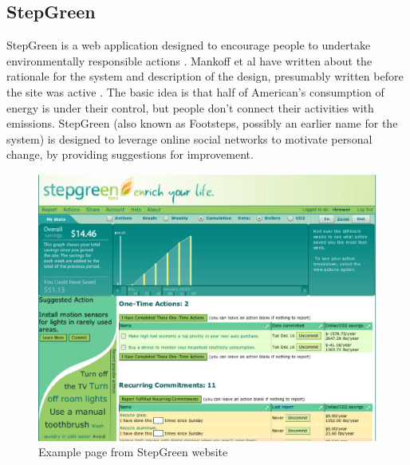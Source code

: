 \subsection{StepGreen}

StepGreen is a web application designed to encourage people to undertake environmentally responsible actions \cite{step-green-website}. Mankoff et al have written about the rationale for the system and description of the design, presumably written before the site was active \cite{Mankoff2007Leveraging-Soci}. The basic idea is that half of American's consumption of energy is under their control, but people don't connect their activities with \COtwo emissions. StepGreen (also known as Footsteps, possibly an earlier name for the system) is designed to leverage online social networks to motivate personal change, by providing suggestions for improvement.

\begin{figure}[htbp]
	\begin{center}
		\includegraphics[width=\textwidth]{figures/final/stepgreen-bitmap}
		\caption{Example page from StepGreen website}
		\label{fig:stepgreen-website}
 	\end{center}
\end{figure}

